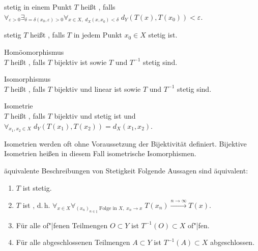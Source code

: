 \begin{Def}{stetig in einem Punkt}
    $T$ heißt , falls\\
    $\forall_{\varepsilon > 0} \exists_{\delta = \delta(x_0, \varepsilon) > 0}
    \forall_{x \in X,\; d_X(x, x_0) < \delta}\; d_Y(T(x), T(x_0)) < \varepsilon$.
\end{Def}

\begin{Def}{stetig}
    $T$ heißt , falls $T$ in jedem Punkt $x_0 \in X$ stetig ist.
\end{Def}

\begin{Def}{Homöomorphismus}\\
    $T$ heißt , falls $T$ bijektiv ist sowie $T$ und $T^{-1}$ stetig sind.
\end{Def}

\begin{Def}{Isomorphismus}\\
    $T$ heißt , falls $T$ bijektiv und linear ist sowie
    $T$ und $T^{-1}$ stetig sind.
\end{Def}

\begin{Def}{Isometrie}\\
    $T$ heißt , falls $T$ bijektiv und stetig ist und
    $\forall_{x_1, x_2 \in X}\; d_Y(T(x_1), T(x_2)) = d_X(x_1, x_2)$.
\end{Def}

\begin{Bem}
    Isometrien werden oft ohne Voraussetzung der Bijektivität definiert.
    Bijektive Isometrien heißen in diesem Fall isometrische Isomorphismen.
\end{Bem}

\linie

\begin{Satz}{äquivalente Beschreibungen von Stetigkeit}
    Folgende Aussagen sind äquivalent:
    \begin{enumerate}
        \item
        $T$ ist stetig.

        \item
        $T$ ist ,
        d.\,h. $\forall_{x \in X}
        \forall_{(x_n)_{n \in \natural} \text{ Folge in } X,\; x_n \to x}\;
        T(x_n) \xrightarrow{n \to \infty} T(x)$.

        \item
        Für alle of"|fenen Teilmengen $O \subset Y$ ist $T^{-1}(O) \subset X$ of"|fen.

        \item
        Für alle abgeschlossenen Teilmengen $A \subset Y$ ist $T^{-1}(A) \subset X$ abgeschlossen.
    \end{enumerate}
\end{Satz}


